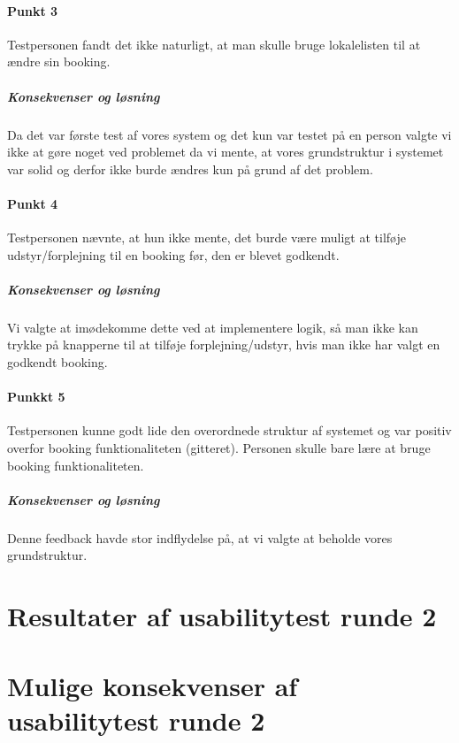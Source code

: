 \paragraph{Punkt 3}
Testpersonen fandt det ikke naturligt, at man skulle bruge lokalelisten til at ændre sin booking.
\subparagraph{Konsekvenser og løsning}
Da det var første test af vores system og det kun var testet på en person valgte vi ikke at gøre noget ved problemet da vi mente, at vores grundstruktur i systemet var solid og derfor ikke burde ændres kun på grund af det problem.

\paragraph{Punkt 4}
Testpersonen nævnte, at hun ikke mente, det burde være muligt at tilføje udstyr/forplejning til en booking før, den er blevet godkendt.
\subparagraph{Konsekvenser og løsning}
Vi valgte at imødekomme dette ved at implementere logik, så man ikke kan trykke på knapperne til at tilføje forplejning/udstyr, hvis man ikke har valgt en godkendt booking.

\paragraph{Punkkt 5}
Testpersonen kunne godt lide den overordnede struktur af systemet og var positiv overfor booking funktionaliteten (gitteret). Personen skulle bare lære at bruge booking funktionaliteten.
\subparagraph{Konsekvenser og løsning}
Denne feedback havde stor indflydelse på, at vi valgte at beholde vores grundstruktur.

\section{Resultater af usabilitytest runde 2}
\label{Usability_R2}
\section{Mulige konsekvenser af usabilitytest runde 2}
\label{Usability_R2_Possibilities}